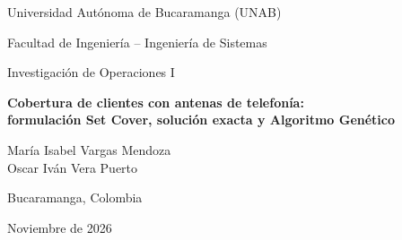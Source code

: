 \documentclass[12pt,a4paper]{article}
\begin{document}
\begin{titlepage}
\centering
\vspace*{2cm}
{\Large Universidad Autónoma de Bucaramanga (UNAB)\par}
{\large Facultad de Ingeniería -- Ingeniería de Sistemas\par}
\vspace{1cm}
{\large Investigación de Operaciones I\par}
\vspace{2.5cm}
{\LARGE\bfseries Cobertura de clientes con antenas de telefonía:\\[4pt]
formulación Set Cover, solución exacta y Algoritmo Genético\par}
\vspace{2.5cm}
{\large María Isabel Vargas Mendoza\\ Oscar Iván Vera Puerto\par}
\vspace{1.5cm}
{\large Bucaramanga, Colombia\par}
{\large Noviembre de 2026\par}
\end{titlepage}

\tableofcontents
\newpage






\end{document}
